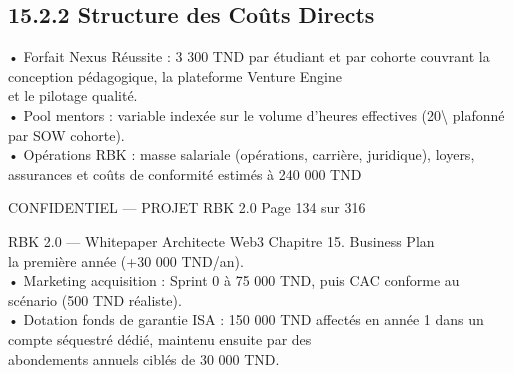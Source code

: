 \subsection{15.2.2 Structure des Coûts Directs}
• Forfait Nexus Réussite : 3 300 TND par étudiant et par cohorte couvrant la conception pédagogique, la plateforme Venture Engine\\
et le pilotage qualité.\\
\vspace{0.5em}
• Pool mentors : variable indexée sur le volume d’heures effectives (20\textbackslash{}%
plafonné par SOW cohorte).\\
\vspace{0.5em}
• Opérations RBK : masse salariale (opérations, carrière, juridique), loyers, assurances et coûts de conformité estimés à 240 000 TND\\
\vspace{0.5em}
\vspace{0.5em}
\begin{confidential}CONFIDENTIEL — PROJET RBK 2.0                                   Page 134 sur 316\end{confidential}
RBK 2.0 — Whitepaper Architecte Web3                                                                                           Chapitre 15. Business Plan\\
\vspace{0.5em}
\vspace{0.5em}
la première année (+30 000 TND/an).\\
\vspace{0.5em}
• Marketing acquisition : Sprint 0 à 75 000 TND, puis CAC conforme au scénario (500 TND réaliste).\\
\vspace{0.5em}
• Dotation fonds de garantie ISA : 150 000 TND affectés en année 1 dans un compte séquestré dédié, maintenu ensuite par des\\
abondements annuels ciblés de 30 000 TND.\\
\vspace{0.5em}
\vspace{0.5em}
